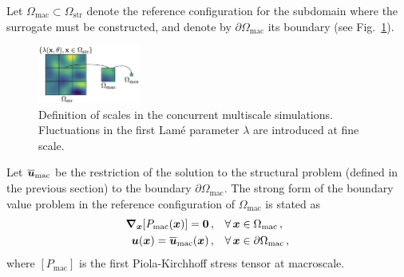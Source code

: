 Let $\Omega_\text{mac} \subset \Omega_\text{str}$ denote the reference configuration for the subdomain where the surrogate must be constructed, and denote by $\partial \Omega_\text{mac}$ its boundary (see Fig.~\ref{fig:scales}).
\begin{figure}[!ht]
    \centering
    \includegraphics[width = 0.3\textwidth]{Pictures/Fig-Scales.png}
    \caption{Definition of scales in the concurrent multiscale simulations. Fluctuations in the first Lam\'e parameter $\lambda$ are introduced at fine scale.}
    \label{fig:scales}
\end{figure}
Let $\overline{{\boldsymbol{u}}}_{\text{mac}}$ be the restriction of the solution to the structural problem (defined in the previous section) to the boundary $\partial \Omega_\text{mac}$. The strong form of the boundary value problem in the reference configuration of $\Omega_\text{mac}$ is stated as
\begin{align}
    \boldsymbol{\nabla}_{{\boldsymbol{x}}} [P_\text{mac}({\boldsymbol{x}})] = {\mathbf{0}}\,,& \quad \forall\,{\boldsymbol{x}} \in \Omega_\text{mac}\,,\\
    {\boldsymbol{u}}({\boldsymbol{x}}) = \overline{{\boldsymbol{u}}}_{\text{mac}}({\boldsymbol{x}})\,,& \quad \forall\, {\boldsymbol{x}} \in \partial \Omega_\text{mac}\,,
\end{align}
where $[P_\text{mac}]$ is the first Piola-Kirchhoff stress tensor at macroscale. %

